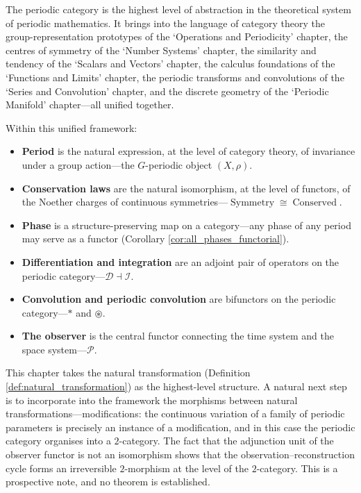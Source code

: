 \begin{remark}\label{rem:periodic_category_hub}
The periodic category is the highest level of abstraction in the theoretical system of periodic mathematics. It brings into the language of category theory the group-representation prototypes of the `Operations and Periodicity' chapter, the centres of symmetry of the `Number Systems' chapter, the similarity and tendency of the `Scalars and Vectors' chapter, the calculus foundations of the `Functions and Limits' chapter, the periodic transforms and convolutions of the `Series and Convolution' chapter, and the discrete geometry of the `Periodic Manifold' chapter---all unified together.

Within this unified framework:
\begin{itemize}
    \item \textbf{Period} is the natural expression, at the level of category theory, of invariance under a group action---the $G$-periodic object $(X, \rho)$.
    \item \textbf{Conservation laws} are the natural isomorphism, at the level of functors, of the Noether charges of continuous symmetries---$\operatorname{Symmetry} \cong \operatorname{Conserved}$.
    \item \textbf{Phase} is a structure-preserving map on a category---any phase of any period may serve as a functor (Corollary \ref{cor:all_phases_functorial}).
    \item \textbf{Differentiation and integration} are an adjoint pair of operators on the periodic category---$\mathcal{D} \dashv \mathcal{I}$.
    \item \textbf{Convolution and periodic convolution} are bifunctors on the periodic category---$*$ and $\circledast$.
    \item \textbf{The observer} is the central functor connecting the time system and the space system---$\mathcal{P}$.
\end{itemize}
\end{remark}

\begin{remark}\label{ch13_higher_category_remark}
This chapter takes the natural transformation (Definition \ref{def:natural_transformation}) as the highest-level structure. A natural next step is to incorporate into the framework the morphisms between natural transformations---modifications: the continuous variation of a family of periodic parameters is precisely an instance of a modification, and in this case the periodic category organises into a $2$-category. The fact that the adjunction unit of the observer functor is not an isomorphism shows that the observation--reconstruction cycle forms an irreversible $2$-morphism at the level of the $2$-category. This is a prospective note, and no theorem is established.
\end{remark}

